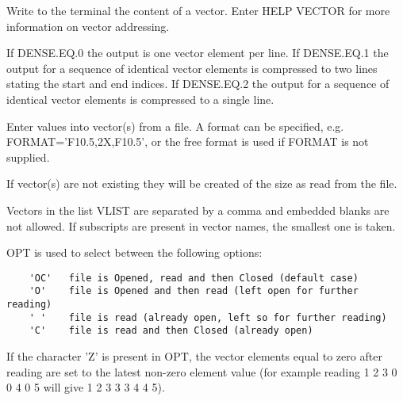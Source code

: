 \ENDCMD


\BEGARG
{}
\ENDARG

   \par
Write to the terminal the content of a vector.  Enter HELP VECTOR for more 
   information on vector addressing.  

   \par
If DENSE.EQ.0 the output is one vector element per line.  If DENSE.EQ.1 the 
   output for a sequence of identical vector elements is compressed to two 
   lines stating the start and end indices.  If DENSE.EQ.2 the output for a 
   sequence of identical vector elements is compressed to a single line.  

\ENDCMD


\BEGARG
{}
\ENDARG
{}
\DEFOPT{\EMPTY}{}
\ENDOPT

   \par
Enter values into vector(s) from a file.  A format can be specified, e.g. 
   FORMAT='F10.5,2X,F10.5', or the free format is used if FORMAT is not 
   supplied.  

   \par
If vector(s) are not existing they will be created of the size as read from 
   the file.  

   \par
Vectors in the list VLIST are separated by a comma and embedded blanks are 
   not allowed. If subscripts are present in vector names, the smallest one is 
   taken.  

   \par
OPT is used to select between the following options:  
\begin{verbatim}
    'OC'   file is Opened, read and then Closed (default case)
    'O'    file is Opened and then read (left open for further reading)
    ' '    file is read (already open, left so for further reading)
    'C'    file is read and then Closed (already open)
\end{verbatim}
   \par
If the character 'Z' is present in OPT, the vector elements equal to zero 
   after reading are set to the latest non-zero element value (for example 
   reading 1 2 3 0 0 4 0 5 will give 1 2 3 3 3 4 4 5).  

